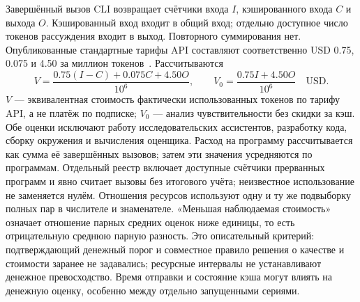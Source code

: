 Завершённый вызов CLI возвращает счётчики входа $I$, кэшированного входа $C$ и выхода $O$. Кэшированный вход входит в общий вход; отдельно доступное число токенов рассуждения входит в выход. Повторного суммирования нет. Опубликованные стандартные тарифы API составляют соответственно USD 0.75, 0.075 и 4.50 за миллион токенов~\cite{openaipricing2026}. Рассчитываются
\begin{equation}
V=\frac{0.75(I-C)+0.075C+4.50O}{10^6},\qquad
V_0=\frac{0.75I+4.50O}{10^6}\quad\mathrm{USD}.
\end{equation}
$V$ --- эквивалентная стоимость фактически использованных токенов по тарифу API, а не платёж по подписке; $V_0$ --- анализ чувствительности без скидки за кэш. Обе оценки исключают работу исследовательских ассистентов, разработку кода, сборку окружения и вычисления оценщика. Расход на программу рассчитывается как сумма её завершённых вызовов; затем эти значения усредняются по программам. Отдельный реестр включает доступные счётчики прерванных программ и явно считает вызовы без итогового учёта; неизвестное использование не заменяется нулём. Отношения ресурсов используют одну и ту же подвыборку полных пар в числителе и знаменателе. «Меньшая наблюдаемая стоимость» означает отношение парных средних оценок ниже единицы, то есть отрицательную среднюю парную разность. Это описательный критерий: подтверждающий денежный порог и совместное правило решения о качестве и стоимости заранее не задавались; ресурсные интервалы не устанавливают денежное превосходство. Время отправки и состояние кэша могут влиять на денежную оценку, особенно между отдельно запущенными сериями.
